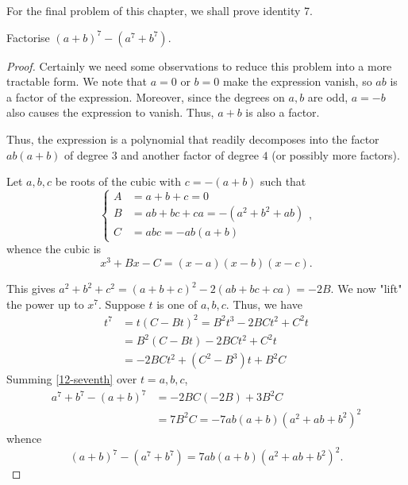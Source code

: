 \documentclass[../jarvis.tex]{subfiles}
\begin{document}
For the final problem of this chapter, we shall prove identity 7.
\begin{example}[Classic]
    Factorise $(a+b)^7-(a^7+b^7)$.
\end{example}
\begin{proof}
    Certainly we need some observations to reduce this problem into a more tractable form. We note that $a=0$ or $b=0$ make the expression vanish, so $ab$ is a factor of the expression. Moreover, since the degrees on $a, b$ are odd, $a=-b$ also causes the expression to vanish. Thus, $a+b$ is also a factor.

    Thus, the expression is a polynomial that readily decomposes into the factor $ab(a+b)$ of degree $3$ and another factor of degree $4$ (or possibly more factors).

    Let $a,b,c$ be roots of the cubic with $c=-(a+b)$ such that
    $$\begin{cases}
        A&=a+b+c=0 \\
        B&=ab+bc+ca=-(a^2+b^2+ab) \\
        C&=abc=-ab(a+b)
    \end{cases},$$
    whence the cubic is $$x^3+Bx-C=(x-a)(x-b)(x-c).$$
    
    This gives $a^2+b^2+c^2=(a+b+c)^2-2(ab+bc+ca)=-2B$. We now "lift" the power up to $x^7$. Suppose $t$ is one of $a,b,c$. Thus, we have
    \begin{align}
        t^7&=t(C-Bt)^2=B^2t^3-2BCt^2+C^2t \\
        &=B^2(C-Bt)-2BCt^2+C^2t \\
        &=-2BCt^2+(C^2-B^3)t+B^2C \label{12-seventh}
    \end{align}
    Summing \eqref{12-seventh} over $t=a,b,c$,
    \begin{align*}
        a^7+b^7-(a+b)^7&=-2BC(-2B)+3B^2C\\
        &=7B^2C=-7ab(a+b)(a^2+ab+b^2)^2
    \end{align*}
    whence $$(a+b)^7-(a^7+b^7)=7ab(a+b)(a^2+ab+b^2)^2.$$
\end{proof}
\end{document}
